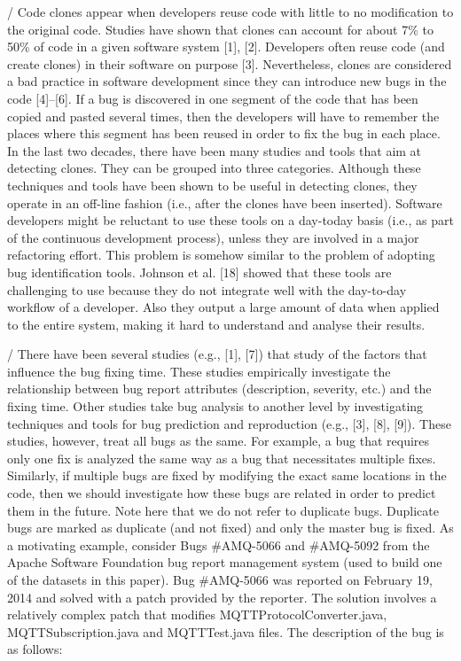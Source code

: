 /%
Code clones appear when developers reuse code with little to no modification to the original code. Studies have shown
that clones can account for about 7\% to 50\% of code in a given software system [1], [2]. Developers often reuse code (and
create clones) in their software on purpose [3]. Nevertheless, clones are considered a bad practice in software development
since they can introduce new bugs in the code [4]–[6]. If a bug is discovered in one segment of the code that has been
copied and pasted several times, then the developers will have to remember the places where this segment has been reused
in order to fix the bug in each place. In the last two decades, there have been many studies and tools that aim at detecting clones. They can be grouped into three categories. Although these techniques and tools have been shown to
be useful in detecting clones, they operate in an off-line fashion (i.e., after the clones have been inserted). Software
developers might be reluctant to use these tools on a day-today basis (i.e., as part of the continuous development process),
unless they are involved in a major refactoring effort. This problem is somehow similar to the problem of adopting bug
identification tools. Johnson et al. [18] showed that these tools are challenging to use because they do not integrate well with
the day-to-day workflow of a developer. Also they output a large amount of data when applied to the entire system, making
it hard to understand and analyse their results.


/%
There have been several studies (e.g., [1], [7]) that study of the factors that influence the bug fixing time. These studies   empirically investigate the relationship between bug report attributes (description, severity, etc.) and the fixing time.  Other studies take bug analysis to another level by investigating techniques and tools for bug prediction and reproduction (e.g., [3], [8], [9]).  These studies, however, treat all bugs as the same. For example, a bug that requires only one fix is analyzed the same way as a bug that necessitates multiple fixes. Similarly, if multiple bugs are fixed by modifying the exact same locations in the code, then we should investigate how these bugs are related in order to predict them in the future. Note here that we do not refer to duplicate bugs. Duplicate bugs are marked as duplicate (and not fixed) and only the master bug is fixed.
As a motivating example, consider Bugs #AMQ-5066 and #AMQ-5092 from the Apache Software Foundation bug report management system (used to build one of the datasets in this paper). Bug #AMQ-5066 was reported on February 19, 2014 and solved with a patch provided by the reporter. The solution involves a relatively complex patch that modifies MQTTProtocolConverter.java, MQTTSubscription.java and MQTTTest.java files. The description of the bug is as follows:

